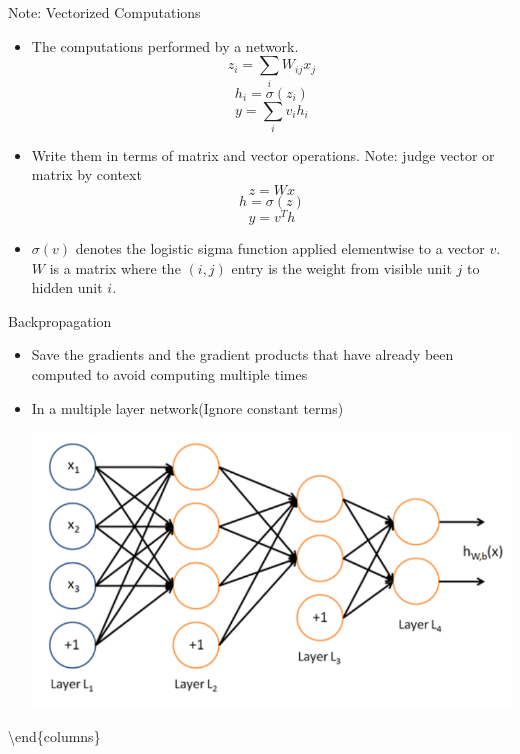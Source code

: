 \documentclass[12pt,notes,mathserif]{beamer}
\providecommand{\tightlist}{%
	\setlength{\itemsep}{0pt}\setlength{\parskip}{0pt}}
\begin{document}
\begin{frame}{Note: Vectorized Computations}

\begin{itemize}
\tightlist
\item
  The computations performed by a network. \[z_i = \sum_{i} W_{ij} x_j\]
  \[h_i=\sigma(z_i)\] \[y=\sum_i v_i h_i\]
\item
  Write them in terms of matrix and vector operations. Note: judge
  vector or matrix by context \[z=Wx\] \[h=\sigma(z)\] \[y=v^T h\]
\item
  \(\sigma(v)\) denotes the logistic sigma function applied elementwise
  to a vector \(v\). \(W\) is a matrix where the \((i,j)\) entry is the
  weight from visible unit \(j\) to hidden unit \(i\).
\end{itemize}

\end{frame}

\begin{frame}{Backpropagation}

\begin{itemize}
\tightlist
\item
  Save the gradients and the gradient products that have already been
  computed to avoid computing multiple times
\item
  In a multiple layer network(Ignore constant terms)\\

  \begin{center}
  \includegraphics[width=\textwidth]{2018-04-15-13-09-15.png}
  \end{center}
\end{itemize}

\textbackslash{}end\{columns\}

\end{frame}
\end{document}
